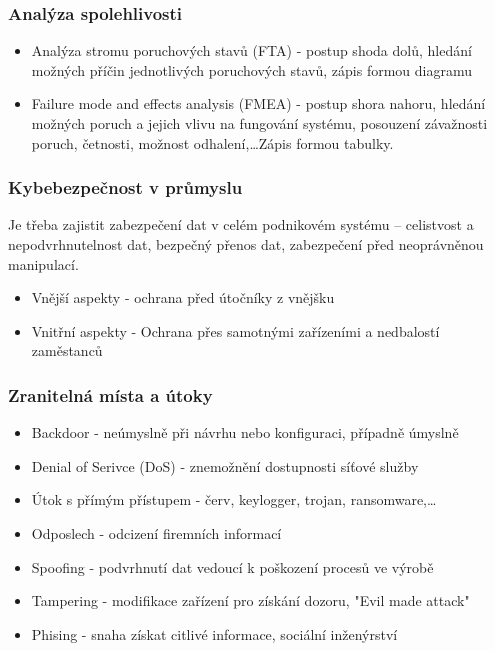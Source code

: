 \subsubsection*{Analýza spolehlivosti}
\begin{itemize}
  \item Analýza stromu poruchových stavů (FTA) - postup shoda dolů, hledání možných příčin jednotlivých poruchových stavů, zápis formou diagramu
  \item Failure mode and effects analysis (FMEA) - postup shora nahoru, hledání možných poruch a jejich vlivu na fungování systému, posouzení závažnosti poruch, četnosti, možnost odhalení,\dots Zápis formou tabulky.
\end{itemize}

\subsubsection*{Kybebezpečnost v průmyslu}
Je třeba zajistit zabezpečení dat v celém podnikovém systému – celistvost a nepodvrhnutelnost dat, bezpečný přenos dat, zabezpečení před neoprávněnou manipulací.
\begin{itemize}
  \item Vnější aspekty - ochrana před útočníky z vnějšku
  \item Vnitřní aspekty - Ochrana přes samotnými zařízeními a nedbalostí zaměstanců
\end{itemize}

\subsubsection*{Zranitelná místa a útoky}
\begin{itemize}
  \item Backdoor - neúmyslně při návrhu nebo konfiguraci, případně úmyslně
  \item Denial of Serivce (DoS) - znemožnění dostupnosti síťové služby
  \item Útok s přímým přístupem - červ, keylogger, trojan, ransomware,\dots
  \item Odposlech - odcizení firemních informací
  \item Spoofing - podvrhnutí dat vedoucí k poškození procesů ve výrobě
  \item Tampering - modifikace zařízení pro získání dozoru, "Evil made attack"
  \item Phising - snaha získat citlivé informace, sociální inženýrství
\end{itemize}

